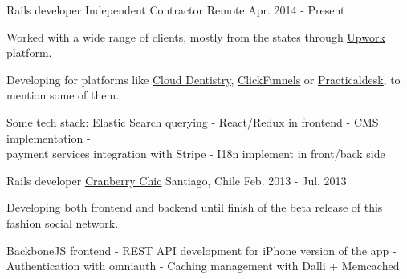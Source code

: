 
\begin{cventries}

  \cventry
    {Rails developer} %
    {Independent Contractor} %
    {Remote} %
    {Apr. 2014 - Present} %
    {
      \begin{cvitems} %
        \item { Worked with a wide range of clients, mostly from the states through
                \href{https://www.upwork.com/freelancers/~0165692cc0b947512e}{\underline{Upwork}} platform.}
        \item { Developing for platforms like
                \href{https://www.clouddentistry.com/}{\underline{Cloud Dentistry}},
                \href{https://www.clickfunnels.com/}{\underline{ClickFunnels}} or
                \href{https://practicaldesk.com/}{\underline{Practicaldesk}},
                to mention some of them.}
        \item { Some tech stack: Elastic Search querying - React/Redux in frontend - CMS implementation - \\
                payment services integration with Stripe - I18n implement in front/back side}
      \end{cvitems}
    }

  \cventry
    {Rails developer} %
    {\href{http://www.cranberrychic.com/}{\underline{Cranberry Chic}}} %
    {Santiago, Chile} %
    {Feb. 2013 - Jul. 2013} %
    {
      \begin{cvitems} %
        \item { Developing both frontend and backend until finish of the beta
                release of this fashion social network.}
        \item { BackboneJS frontend - REST API development for iPhone version of the app -\\
                Authentication with omniauth - Caching management with Dalli + Memcached }
      \end{cvitems}
    }


\end{cventries}
